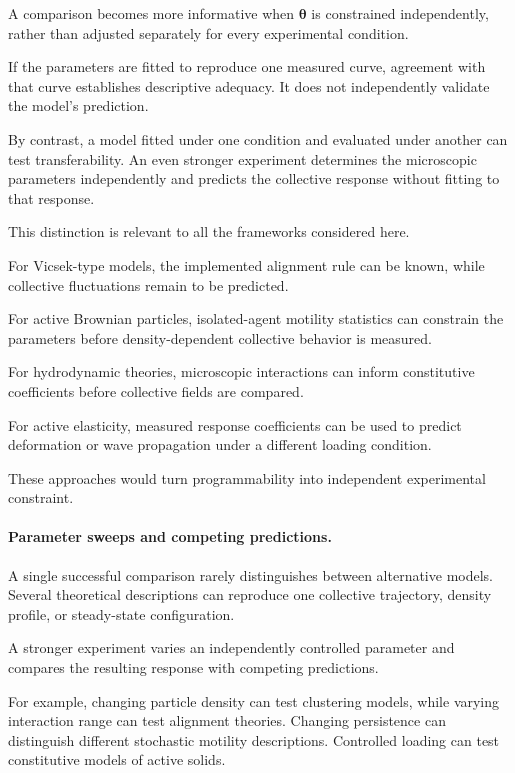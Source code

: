 A comparison becomes more informative
when $\boldsymbol{\theta}$ is
constrained independently,
rather than adjusted
separately for every
experimental condition.

If the parameters are
fitted to reproduce
one measured curve,
agreement with that
curve establishes
descriptive adequacy.
It does not
independently validate
the model's prediction.

By contrast,
a model fitted
under one condition
and evaluated under
another can test
transferability.
An even stronger
experiment determines
the microscopic
parameters independently
and predicts the
collective response
without fitting
to that response.

This distinction
is relevant to
all the frameworks
considered here.

For Vicsek-type
models, the
implemented alignment
rule can be known,
while collective
fluctuations remain
to be predicted.

For active Brownian
particles, isolated-agent
motility statistics
can constrain
the parameters
before density-dependent
collective behavior
is measured.

For hydrodynamic
theories, microscopic
interactions can
inform constitutive
coefficients before
collective fields
are compared.

For active elasticity,
measured response
coefficients can
be used to predict
deformation or
wave propagation
under a different
loading condition.

These approaches
would turn
programmability
into independent
experimental constraint.

\paragraph*{Parameter sweeps and competing predictions.}

A single successful comparison
rarely distinguishes
between alternative
models. Several
theoretical descriptions
can reproduce one
collective trajectory,
density profile,
or steady-state
configuration.

A stronger experiment
varies an independently
controlled parameter
and compares the
resulting response
with competing
predictions.

For example,
changing particle
density can test
clustering models,
while varying
interaction range
can test alignment
theories.
Changing persistence
can distinguish
different stochastic
motility descriptions.
Controlled loading
can test constitutive
models of active
solids.


